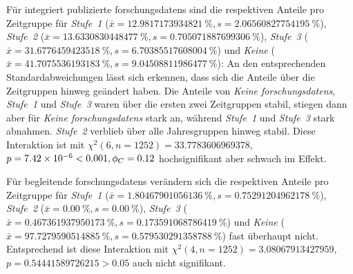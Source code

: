 Für integriert publizierte \glspl{forschungsdaten} sind die respektiven Anteile pro Zeitgruppe für \textit{Stufe~1} ($\bar{x}=\SI[round-mode=places,round-precision=2]{12.9817173934821}{\percent},s=\SI[round-mode=places,round-precision=2]{2.06560827754195}{\percent}$), \textit{Stufe~2} ($\bar{x}=\SI[round-mode=places,round-precision=2]{13.6330830448477}{\percent},s=\SI[round-mode=places,round-precision=2]{0.705071887699306}{\percent}$), \textit{Stufe~3} ($\bar{x}=\SI[round-mode=places,round-precision=2]{31.6776459423518}{\percent},s=\SI[round-mode=places,round-precision=2]{6.70385517608004}{\percent}$) und \textit{Keine} ($\bar{x}=\SI[round-mode=places,round-precision=2]{41.7075536193183}{\percent},s=\SI[round-mode=places,round-precision=2]{9.04508811986477}{\percent}$):
An den entsprechenden Standardabweichungen lässt sich erkennen, dass sich die Anteile über die Zeitgruppen hinweg geändert haben.
Die Anteile von \textit{Keine \glspl{forschungsdaten}}, \textit{Stufe~1} und \textit{Stufe~3} waren über die ersten zwei Zeitgruppen stabil, stiegen dann aber für \textit{Keine \glspl{forschungsdaten}} stark an, während \textit{Stufe~1} und \textit{Stufe~3} stark abnahmen.
\textit{Stufe~2} verblieb über alle Jahresgruppen hinweg stabil.
Diese Interaktion ist mit $\chi^2 (\num{6}, n=\num{1252}) = \num[round-mode=places,round-precision=2]{33.7783606969378}$, $p = \num[round-mode=places,round-precision=2]{7.42382998991651E-06}<\num{0.001},\phi_C=\num[round-mode=places,round-precision=2]{0.116145428931647}$ hochsignifikant aber schwach im Effekt.

Für begleitende \glspl{forschungsdaten} verändern sich die respektiven Anteile pro Zeitgruppe für \textit{Stufe~1} ($\bar{x}=\SI[round-mode=places,round-precision=2]{1.80467901056136}{\percent},s=\SI[round-mode=places,round-precision=2]{0.75291204962178}{\percent}$), \textit{Stufe~2} ($\bar{x}=\SI[round-mode=places,round-precision=2]{0,00}{\percent},s=\SI[round-mode=places,round-precision=2]{0.00}{\percent}$), \textit{Stufe~3} ($\bar{x}=\SI[round-mode=places,round-precision=2]{0.467361937950173}{\percent},s=\SI[round-mode=places,round-precision=2]{0.173591068786419}{\percent}$) und \textit{Keine} ($\bar{x}=\SI[round-mode=places,round-precision=2]{97.7279590514885}{\percent},s=\SI[round-mode=places,round-precision=2]{0.579530291358788}{\percent}$) fast überhaupt nicht.
Entsprechend ist diese Interaktion mit $\chi^2 (\num{4}, n=\num{1252}) = \num[round-mode=places,round-precision=2]{3.08067913427959}$, $p = \num[round-mode=places,round-precision=2]{0.54441589726215}>\num{0.05}$ auch nicht signifikant.

